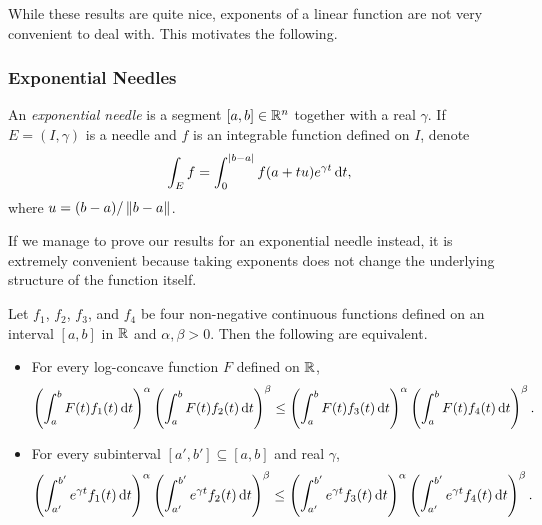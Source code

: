 While these results are quite nice, exponents of a linear function are not very convenient to deal with. This motivates the following.

\subsubsection{Exponential Needles}
\label{sec: 5.1.3}

\begin{definition}
	An \textit{exponential needle} is a segment $[a,b]\in\mathbb{R}^n$ together with a real $\gamma$. If $E=(I,\gamma)$ is a needle and $f$ is an integrable function defined on $I$, denote
	\[ \int_E f = \int_{0}^{|b-a|} f(a+tu)e^{\gamma t} \operatorname{d}\!{t}, \]
	where $u=(b-a)/\left\lVert b-a\right\rVert$.
\end{definition}

If we manage to prove our results for an exponential needle instead, it is extremely convenient because taking exponents does not change the underlying structure of the function itself.

\begin{lemma}
	\label{localized exponential needle interconversion}
	Let $f_1$, $f_2$, $f_3$, and $f_4$ be four non-negative continuous functions defined on an interval $[a,b]$ in $\mathbb{R}$ and $\alpha,\beta>0$. Then the following are equivalent.
	\begin{itemize}
		\item For every log-concave function $F$ defined on $\mathbb{R}$, 
		\[ \left(\int_a^b F(t)f_1(t)\operatorname{d}\!{t}\right)^\alpha \left(\int_a^b F(t)f_2(t)\operatorname{d}\!{t}\right)^\beta \leq \left(\int_a^b F(t)f_3(t)\operatorname{d}\!{t}\right)^\alpha \left(\int_a^b F(t)f_4(t)\operatorname{d}\!{t}\right)^\beta. \]

		\item For every subinterval $[a',b']\subseteq[a,b]$ and real $\gamma$,
		\[ \left(\int_{a'}^{b'} e^{\gamma t}f_1(t)\operatorname{d}\!{t}\right)^\alpha \left(\int_{a'}^{b'} e^{\gamma t}f_2(t)\operatorname{d}\!{t}\right)^\beta \leq \left(\int_{a'}^{b'} e^{\gamma t}f_3(t)\operatorname{d}\!{t}\right)^\alpha \left(\int_{a'}^{b'} e^{\gamma t}f_4(t)\operatorname{d}\!{t}\right)^\beta. \]
	\end{itemize}
\end{lemma}

